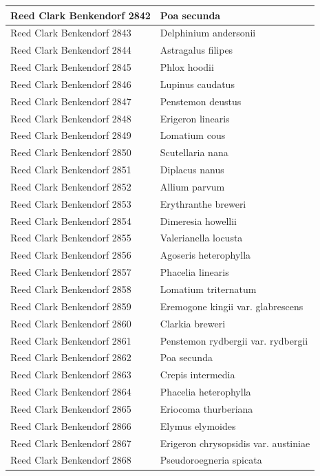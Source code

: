 \documentclass[
]{article}
\begin{document}
\begin{longtable}{l|l}
\hline
Reed Clark Benkendorf 2842 & Poa secunda\\
\hline
Reed Clark Benkendorf 2843 & Delphinium andersonii\\
\hline
Reed Clark Benkendorf 2844 & Astragalus filipes\\
\hline
Reed Clark Benkendorf 2845 & Phlox hoodii\\
\hline
Reed Clark Benkendorf 2846 & Lupinus caudatus\\
\hline
Reed Clark Benkendorf 2847 & Penstemon deustus\\
\hline
Reed Clark Benkendorf 2848 & Erigeron linearis\\
\hline
Reed Clark Benkendorf 2849 & Lomatium cous\\
\hline
Reed Clark Benkendorf 2850 & Scutellaria nana\\
\hline
Reed Clark Benkendorf 2851 & Diplacus nanus\\
\hline
Reed Clark Benkendorf 2852 & Allium parvum\\
\hline
Reed Clark Benkendorf 2853 & Erythranthe breweri\\
\hline
Reed Clark Benkendorf 2854 & Dimeresia howellii\\
\hline
Reed Clark Benkendorf 2855 & Valerianella locusta\\
\hline
Reed Clark Benkendorf 2856 & Agoseris heterophylla\\
\hline
Reed Clark Benkendorf 2857 & Phacelia linearis\\
\hline
Reed Clark Benkendorf 2858 & Lomatium triternatum\\
\hline
Reed Clark Benkendorf 2859 & Eremogone kingii var. glabrescens\\
\hline
Reed Clark Benkendorf 2860 & Clarkia breweri\\
\hline
Reed Clark Benkendorf 2861 & Penstemon rydbergii var. rydbergii\\
\hline
Reed Clark Benkendorf 2862 & Poa secunda\\
\hline
Reed Clark Benkendorf 2863 & Crepis intermedia\\
\hline
Reed Clark Benkendorf 2864 & Phacelia heterophylla\\
\hline
Reed Clark Benkendorf 2865 & Eriocoma thurberiana\\
\hline
Reed Clark Benkendorf 2866 & Elymus elymoides\\
\hline
Reed Clark Benkendorf 2867 & Erigeron chrysopsidis var. austiniae\\
\hline
Reed Clark Benkendorf 2868 & Pseudoroegneria spicata\\

\end{longtable}
\end{document}
